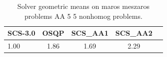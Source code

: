 \begin{table}
\centering
\caption{Solver geometric means on maros meszaros problems AA 5 5 nonhomog problems.}
\label{t-maros meszaros problems AA 5 5 nonhomog-geom_mean}
\begin{tabular}{lcccc}
\toprule
 SCS-3.0 &  OSQP &  SCS\_AA1 &  SCS\_AA2 \\
\midrule
    1.00 &  1.86 &     1.69 &     2.29 \\
\bottomrule
\end{tabular}
\end{table}

